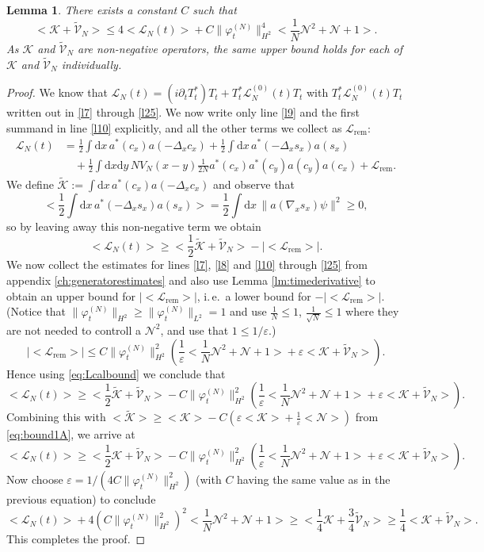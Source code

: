 \documentclass[11pt,a4paper,draft,DIV11]{scrartcl}	%
\newtheorem{lem}[thm]{Lemma}
\newcommand{\di}{\textrm{d}}		%
\newcommand{\Lcal}{\mathcal{L}}		%
\newcommand{\Ncal}{\mathcal{N}}		%
\newcommand{\Kcal}{\mathcal{K}}		%
\newcommand{\tilV}{\tilde{\mathcal{V}}_N}		%
\newcommand{\tilK}{\tilde{\mathcal{K}}}		%
\newcommand{\norm}[1]{\lVert#1\rVert}	%
\newcommand{\ev}[1]{\big<#1\big>}	%
\newcommand{\ph}{\varphi_t^{(N)}}	%
\newcommand{\be}[1]{\begin{equation}\label{eq:#1}}	%
\newcommand{\ee}{\end{equation}}
\newcommand{\bd}{\begin{displaymath}}			%
\newcommand{\ed}{\end{displaymath}}
\newcommand{\eqr}[1]{\eqref{eq:#1}}			%
\begin{document}
\begin{lem}
\label{lem:kvbounds}
There exists a constant $C$ such that
\bd
\ev{\Kcal + \tilV} \leq 4 \ev{\Lcal_N(t)} + C \norm{\ph}_{H^2}^4 \ev{\frac{1}{N}\Ncal^2 + \Ncal + 1}.
\ed
As $\Kcal$ and $\tilV$ are non-negative operators, the same upper bound holds for each of $\Kcal$ and $\tilV$ individually.
\end{lem}
\begin{proof}
We know that $\Lcal_N(t) = (i\partial_t T^\ast_t)T_t + T^\ast_t
\Lcal_N^{(0)}(t)T_t$ with $T^\ast_t \Lcal_N^{(0)}(t)T_t$ written out in
\eqref{l7} through \eqref{l25}. We now write only line \eqref{l9} and the
first summand in line \eqref{l10} explicitly, and all the other terms we collect as $\Lcal_{\textrm{rem}}$:
\begin{align*}
\Lcal_N(t) & = \frac{1}{2} \int \di x\, a^\ast(c_x) a(-\Delta_x c_x) + \frac{1}{2}\int \di x\, a^\ast(-\Delta_x s_x)a(s_x) \\
& \quad + \frac{1}{2}\int \di x\di y\, NV_N(x-y) \frac{1}{2N} a^\ast(c_x) a^\ast(c_y) a(c_y) a(c_x) + \Lcal_{\textrm{rem}}.
\end{align*}
We define $\tilK := \int \di x\, a^\ast(c_x) a(-\Delta_x c_x)$ and observe that
\bd
\ev{\frac{1}{2}\int \di x\, a^\ast(-\Delta_x s_x)a(s_x)} = \frac{1}{2}\int \di x\, \norm{a(\nabla_x s_x)\psi}^2 \geq 0,
\ed
so by leaving away this non-negative term we obtain
\be{Lcalbound}
\ev{\Lcal_N(t)} \geq \ev{\frac{1}{2}\tilK + \tilV} - \lvert\ev{\Lcal_{\textrm{rem}}}\rvert.
\ee
We now collect the estimates for lines \eqref{l7}, \eqref{l8} and \eqref{l10} through \eqref{l25} from appendix \ref{ch:generatorestimates} and also use Lemma \ref{lm:timederivative} to obtain an upper bound for $\lvert\ev{\Lcal_{\textrm{rem}}}\rvert$, i.\,e.\ a lower bound for $-\lvert\ev{\Lcal_{\textrm{rem}}}\rvert$.
(Notice that $\norm{\ph}_{H^2} \geq \norm{\ph}_{L^2} =1$ and use $\frac{1}{N} \leq 1$, $\frac{1}{\sqrt{N}} \leq 1$ where they are not needed to controll a $\Ncal^2$, and use that $1 \leq 1/\varepsilon$.)
\bd
\lvert\ev{\Lcal_{\textrm{rem}}}\rvert \leq C \norm{\ph}_{H^2}^2 \left( \frac{1}{\varepsilon}\ev{\frac{1}{N}\Ncal^2 + \Ncal + 1} + \varepsilon\ev{\Kcal+\tilV} \right).
\ed
Hence using \eqr{Lcalbound} we conclude that
\bd
\ev{\Lcal_N(t)} \geq \ev{\frac{1}{2}\tilK+\tilV} - C\norm{\ph}_{H^2}^2 \left( \frac{1}{\varepsilon}\ev{\frac{1}{N}\Ncal^2 +\Ncal+1} + \varepsilon \ev{\Kcal+\tilV} \right).
\ed
Combining this with $\ev{\tilK} \geq \ev{\Kcal} - C\left(\varepsilon\ev{\Kcal} + \frac{1}{\varepsilon}\ev{\Ncal} \right)$ from \eqref{eq:bound1A}, we arrive at
\bd
\ev{\Lcal_N(t)} \geq  \ev{\frac{1}{2}\Kcal+\tilV} - C\norm{\ph}_{H^2}^2 \left( \frac{1}{\varepsilon}\ev{\frac{1}{N}\Ncal^2 +\Ncal+1} + \varepsilon \ev{\Kcal+\tilV} \right).
\ed
Now choose $\varepsilon = 1/(4C\norm{\ph}_{H^2}^2)$ (with $C$ having the same value as in the previous equation) to conclude
\bd
\ev{\Lcal_N(t)} + 4\left( C \norm{\ph}_{H^2}^2 \right)^2
\ev{\frac{1}{N}\Ncal^2 + \Ncal + 1} \geq
\ev{\frac{1}{4}\Kcal+\frac{3}{4}\tilV} \geq \frac{1}{4} \ev{\Kcal + \tilV}.
\ed
This completes the proof.
\end{proof}
\end{document}
